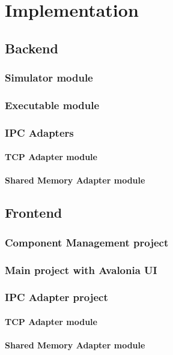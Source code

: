\chapter{Implementation}

\section{Backend}

\subsection{Simulator module}

\subsection{Executable module}

\subsection{IPC Adapters}

\subsubsection{TCP Adapter module}

\subsubsection{Shared Memory Adapter module}

\section{Frontend}

\subsection{Component Management project}

\subsection{Main project with Avalonia UI}

\subsection{IPC Adapter project}

\subsubsection{TCP Adapter module}

\subsubsection{Shared Memory Adapter module}